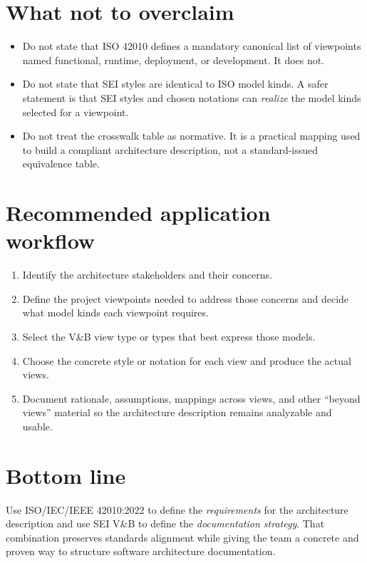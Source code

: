 \documentclass[11pt]{article}
\begin{document}
\section*{What not to overclaim}
\begin{itemize}
  \item Do not state that ISO 42010 defines a mandatory canonical list of viewpoints named functional, runtime, deployment, or development. It does not.\cite{iso42010,conceptualmodel}
  \item Do not state that SEI styles are identical to ISO model kinds. A safer statement is that SEI styles and chosen notations can \emph{realize} the model kinds selected for a viewpoint.\cite{iso42010,conceptualmodel,vandb}
  \item Do not treat the crosswalk table as normative. It is a practical mapping used to build a compliant architecture description, not a standard-issued equivalence table.\cite{iso42010,conceptualmodel}
\end{itemize}

\section*{Recommended application workflow}
\begin{enumerate}[leftmargin=1.5em]
  \item Identify the architecture stakeholders and their concerns.\cite{iso42010,conceptualmodel}
  \item Define the project viewpoints needed to address those concerns and decide what model kinds each viewpoint requires.\cite{iso42010,conceptualmodel}
  \item Select the V\&B view type or types that best express those models.\cite{vandb}
  \item Choose the concrete style or notation for each view and produce the actual views.\cite{vandb}
  \item Document rationale, assumptions, mappings across views, and other ``beyond views'' material so the architecture description remains analyzable and usable.\cite{vandb}
\end{enumerate}

\section*{Bottom line}
Use ISO/IEC/IEEE 42010:2022 to define the \emph{requirements} for the architecture description and use SEI V\&B to define the \emph{documentation strategy}. That combination preserves standards alignment while giving the team a concrete and proven way to structure software architecture documentation.\cite{iso42010,conceptualmodel,vandb}
\end{document}
